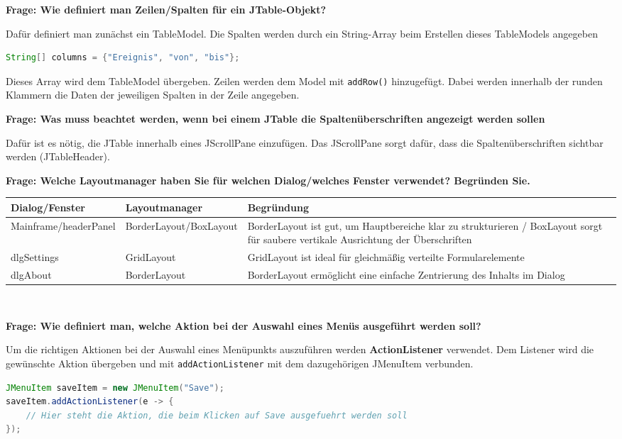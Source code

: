 \documentclass[a4paper]{article}
\newenvironment{frage}[1]{%
	\par\noindent\textbf{Frage: #1}\par
}{\medskip}
\begin{document}
	\begin{frage}{Wie definiert man Zeilen/Spalten für ein JTable-Objekt?}
		Dafür definiert man zunächst ein TableModel. Die Spalten werden durch ein String-Array beim Erstellen dieses TableModels angegeben \begin{lstlisting}[language=Java]
String[] columns = {"Ereignis", "von", "bis"};
		\end{lstlisting} Dieses Array wird dem TableModel übergeben. Zeilen werden dem Model mit \texttt{addRow()} hinzugefügt. Dabei werden innerhalb der runden Klammern die Daten der jeweiligen Spalten in der Zeile angegeben.
	\end{frage}
	\\
	\begin{frage}{Was muss beachtet werden, wenn bei einem JTable die Spaltenüberschriften angezeigt werden sollen}
		Dafür ist es nötig, die JTable innerhalb eines JScrollPane einzufügen. Das JScrollPane sorgt dafür, dass die Spaltenüberschriften sichtbar werden (JTableHeader).
	\end{frage}
	\\
	\begin{frage}{Welche Layoutmanager haben Sie für welchen Dialog/welches Fenster verwendet? Begründen Sie.} 
		\begin{tabularx}{\textwidth}{|l|l|X|}
			\hline
			\textbf{Dialog/Fenster} & \textbf{Layoutmanager} & \textbf{Begründung} \\
			\hline
			Mainframe/headerPanel & BorderLayout/BoxLayout & BorderLayout ist gut, um Hauptbereiche klar zu strukturieren / BoxLayout sorgt für saubere vertikale Ausrichtung der Überschriften \\
			\hline
			dlgSettings & GridLayout & GridLayout ist ideal für gleichmäßig verteilte Formularelemente \\
			\hline
			dlgAbout & BorderLayout & BorderLayout ermöglicht eine einfache Zentrierung des Inhalts im Dialog \\
			\hline
		\end{tabularx}
	\end{frage}
	\\
	\begin{frage}{Wie definiert man, welche Aktion bei der Auswahl eines Menüs ausgeführt werden soll?}
		Um die richtigen Aktionen bei der Auswahl eines Menüpunkts auszuführen werden \textbf{ActionListener} verwendet. Dem Listener wird die gewünschte Aktion übergeben und mit \texttt{addActionListener} mit dem dazugehörigen JMenuItem verbunden. 
		\begin{lstlisting}[language=java]
JMenuItem saveItem = new JMenuItem("Save");
saveItem.addActionListener(e -> {
	// Hier steht die Aktion, die beim Klicken auf Save ausgefuehrt werden soll
});
		\end{lstlisting}
		
	\end{frage}
	
\end{document}
